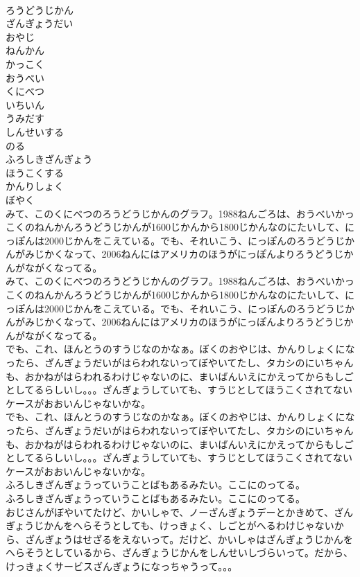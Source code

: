 \documentclass[8pt]{extreport}
\begin{document}
\begin{CJK}{UTF8}{min}
\\	ろうどうじかん
\\	ざんぎょうだい
\\	おやじ
\\	ねんかん
\\	かっこく
\\	おうべい
\\	くにべつ
\\	いちいん
\\	うみだす
\\	しんせいする
\\	のる
\\	ふろしきざんぎょう
\\	ほうこくする
\\	かんりしょく
\\	ぼやく
\\	みて、このくにべつのろうどうじかんのグラフ。1988ねんごろは、おうべいかっこくのねんかんろうどうじかんが1600じかんから1800じかんなのにたいして、にっぽんは2000じかんをこえている。でも、それいこう、にっぽんのろうどうじかんがみじかくなって、2006ねんにはアメリカのほうがにっぽんよりろうどうじかんがながくなってる。
\\	みて、このくにべつのろうどうじかんのグラフ。1988ねんごろは、おうべいかっこくのねんかんろうどうじかんが1600じかんから1800じかんなのにたいして、にっぽんは2000じかんをこえている。でも、それいこう、にっぽんのろうどうじかんがみじかくなって、2006ねんにはアメリカのほうがにっぽんよりろうどうじかんがながくなってる。
\\	でも、これ、ほんとうのすうじなのかなぁ。ぼくのおやじは、かんりしょくになったら、ざんぎょうだいがはらわれないってぼやいてたし、タカシのにいちゃんも、おかねがはらわれるわけじゃないのに、まいばんいえにかえってからもしごとしてるらしいし。。。ざんぎょうしていても、すうじとしてほうこくされてないケースがおおいんじゃないかな。
\\	でも、これ、ほんとうのすうじなのかなぁ。ぼくのおやじは、かんりしょくになったら、ざんぎょうだいがはらわれないってぼやいてたし、タカシのにいちゃんも、おかねがはらわれるわけじゃないのに、まいばんいえにかえってからもしごとしてるらしいし。。。ざんぎょうしていても、すうじとしてほうこくされてないケースがおおいんじゃないかな。
\\	ふろしきざんぎょうっていうことばもあるみたい。ここにのってる。
\\	ふろしきざんぎょうっていうことばもあるみたい。ここにのってる。
\\	おじさんがぼやいてたけど、かいしゃで、ノーざんぎょうデーとかきめて、ざんぎょうじかんをへらそうとしても、けっきょく、しごとがへるわけじゃないから、ざんぎょうはせざるをえないって。だけど、かいしゃはざんぎょうじかんをへらそうとしているから、ざんぎょうじかんをしんせいしづらいって。だから、けっきょくサービスざんぎょうになっちゃうって。。。

\end{CJK}
\end{document}
